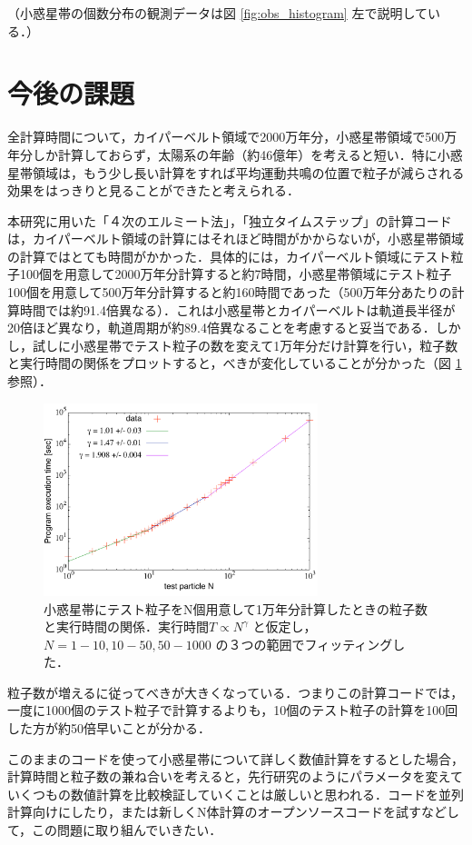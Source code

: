 \documentclass[11pt,a4paper,oneside,onecolumn]{jreport}
\begin{document}
（小惑星帯の個数分布の観測データは図 \ref{fig:obs_histogram} 左で説明している．）
\\


\section{今後の課題}
全計算時間について，カイパーベルト領域で2000万年分，小惑星帯領域で500万年分しか計算しておらず，太陽系の年齢（約46億年）を考えると短い．特に小惑星帯領域は，もう少し長い計算をすれば平均運動共鳴の位置で粒子が減らされる効果をはっきりと見ることができたと考えられる．

本研究に用いた「４次のエルミート法」，「独立タイムステップ」の計算コードは，カイパーベルト領域の計算にはそれほど時間がかからないが，小惑星帯領域の計算ではとても時間がかかった．具体的には，カイパーベルト領域にテスト粒子100個を用意して2000万年分計算すると約7時間，小惑星帯領域にテスト粒子100個を用意して500万年分計算すると約160時間であった（500万年分あたりの計算時間では約91.4倍異なる）．これは小惑星帯とカイパーベルトは軌道長半径が20倍ほど異なり，軌道周期が約89.4倍異なることを考慮すると妥当である．しかし，試しに小惑星帯でテスト粒子の数を変えて1万年分だけ計算を行い，粒子数と実行時間の関係をプロットすると，べきが変化していることが分かった（図 \ref{fig:Nbody_test} 参照）．
\begin{figure}[H]
\centering
\includegraphics[width=8cm]{./image/Nbody_test.pdf}
\caption{小惑星帯にテスト粒子をN個用意して1万年分計算したときの粒子数と実行時間の関係．実行時間$T \propto N^{\gamma}$ と仮定し，$N = 1 - 10, 10 - 50, 50 - 1000$ の３つの範囲でフィッティングした． \label{fig:Nbody_test}}
\end{figure}
粒子数が増えるに従ってべきが大きくなっている．つまりこの計算コードでは，一度に1000個のテスト粒子で計算するよりも，10個のテスト粒子の計算を100回した方が約50倍早いことが分かる．

このままのコードを使って小惑星帯について詳しく数値計算をするとした場合，計算時間と粒子数の兼ね合いを考えると，先行研究のようにパラメータを変えていくつもの数値計算を比較検証していくことは厳しいと思われる．コードを並列計算向けにしたり，または新しくN体計算のオープンソースコードを試すなどして，この問題に取り組んでいきたい．
\end{document}
